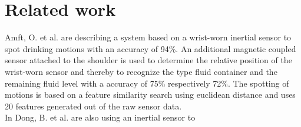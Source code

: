 \section{Related work}
Amft, O. et al. \cite{5470653} are describing a system based on a wrist-worn inertial sensor to spot drinking motions with an accuracy of 94\%. An additional magnetic coupled sensor attached to the shoulder is used to determine the relative position of the wrist-worn sensor and thereby to recognize the type fluid container and the remaining fluid level with a accuracy of 75\% respectively 72\%. The spotting of motions is based on a feature similarity search using euclidean distance and uses 20 features generated out of the raw sensor data.\\
In \cite{7038937} Dong, B. et al. are also using an inertial sensor to \\
\cite{7031280} \cite{8229307}